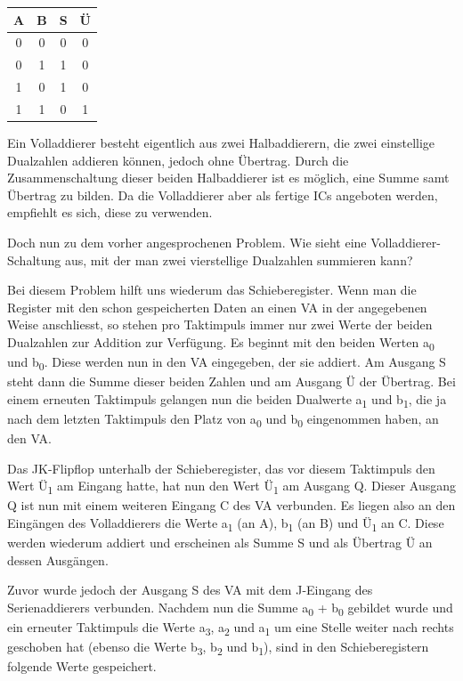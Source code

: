 \begin{table}[htbp]
  \centering
  \begin{tabular}{cccc}
    \toprule
    A & B & S & Ü \\
    \midrule
    0 & 0 & 0 & 0 \\
    0 & 1 & 1 & 0 \\
    1 & 0 & 1 & 0 \\
    1 & 1 & 0 & 1 \\
    \bottomrule
  \end{tabular}
\end{table}

Ein Volladdierer besteht eigentlich aus zwei Halbaddierern, die zwei einstellige Dualzahlen addieren können, jedoch ohne Übertrag. Durch die Zusammenschaltung dieser beiden Halbaddierer ist es möglich, eine Summe samt Übertrag zu bilden. Da die Volladdierer aber als fertige ICs angeboten werden, empfiehlt es sich, diese zu verwenden.

Doch nun zu dem vorher angesprochenen Problem. Wie sieht eine Volladdierer-Schaltung aus, mit der man zwei vierstellige Dualzahlen summieren kann?

Bei diesem Problem hilft uns wiederum das Schieberegister. Wenn man die Register mit den schon gespeicherten Daten an einen VA in der angegebenen Weise anschliesst, so stehen pro Taktimpuls immer nur zwei Werte der beiden Dualzahlen zur Addition zur Verfügung. Es beginnt mit den beiden Werten a\textsubscript{0} und b\textsubscript{0}. Diese werden nun in den VA eingegeben, der sie addiert. Am Ausgang S steht dann die Summe dieser beiden Zahlen und am Ausgang Ü der Übertrag. Bei einem erneuten Taktimpuls gelangen nun die beiden Dualwerte a\textsubscript{1} und b\textsubscript{1}, die ja nach dem letzten Taktimpuls den Platz von a\textsubscript{0} und b\textsubscript{0} eingenommen haben, an den VA.

Das JK-Flipflop unterhalb der Schieberegister, das vor diesem Taktimpuls den Wert Ü\textsubscript{1} am Eingang hatte, hat nun den Wert Ü\textsubscript{1} am Ausgang Q. Dieser Ausgang Q ist nun mit einem weiteren Eingang C des VA verbunden. Es liegen also an den Eingängen des Volladdierers die Werte a\textsubscript{1} (an A), b\textsubscript{1} (an B) und Ü\textsubscript{1} an C. Diese werden wiederum addiert und erscheinen als Summe S und als Übertrag Ü an dessen Ausgängen.

Zuvor wurde jedoch der Ausgang S des VA mit dem J-Eingang des Serienaddierers verbunden. Nachdem nun die Summe a\textsubscript{0} + b\textsubscript{0} gebildet wurde und ein erneuter Taktimpuls die Werte a\textsubscript{3}, a\textsubscript{2} und a\textsubscript{1} um eine Stelle weiter nach rechts geschoben hat (ebenso die Werte b\textsubscript{3}, b\textsubscript{2} und b\textsubscript{1}), sind in den Schieberegistern folgende Werte gespeichert.

